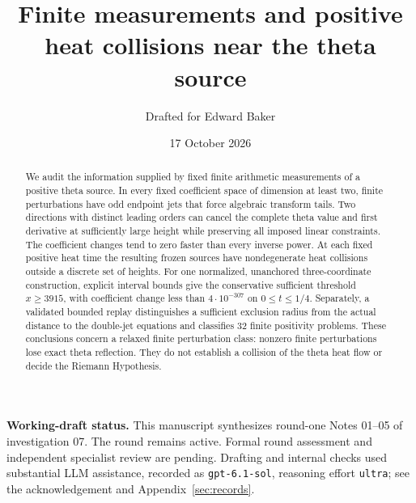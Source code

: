 \documentclass[11pt]{article}
\title{Finite measurements and positive heat collisions near the theta source}
\author{Drafted for Edward Baker}
\date{17 October 2026}
\theoremstyle{remark}\newtheorem{remark}[theorem]{Remark}
\begin{document}
\maketitle
\begin{abstract}
We audit the information supplied by fixed finite arithmetic measurements of a positive theta source. In every fixed coefficient space of dimension at least two, finite perturbations have odd endpoint jets that force algebraic transform tails. Two directions with distinct leading orders can cancel the complete theta value and first derivative at sufficiently large height while preserving all imposed linear constraints. The coefficient changes tend to zero faster than every inverse power. At each fixed positive heat time the resulting frozen sources have nondegenerate heat collisions outside a discrete set of heights. For one normalized, unanchored three-coordinate construction, explicit interval bounds give the conservative sufficient threshold $x\ge3915$, with coefficient change less than $4\cdot10^{-307}$ on $0\le t\le1/4$. Separately, a validated bounded replay distinguishes a sufficient exclusion radius from the actual distance to the double-jet equations and classifies 32 finite positivity problems. These conclusions concern a relaxed finite perturbation class: nonzero finite perturbations lose exact theta reflection. They do not establish a collision of the theta heat flow or decide the Riemann Hypothesis.
\end{abstract}

\noindent\textbf{Working-draft status.} This manuscript synthesizes round-one Notes 01--05 of investigation 07. The round remains active. Formal round assessment and independent specialist review are pending. Drafting and internal checks used substantial LLM assistance, recorded as \texttt{gpt-6.1-sol}, reasoning effort \texttt{ultra}; see the acknowledgement and Appendix~\ref{sec:records}.
\end{document}
